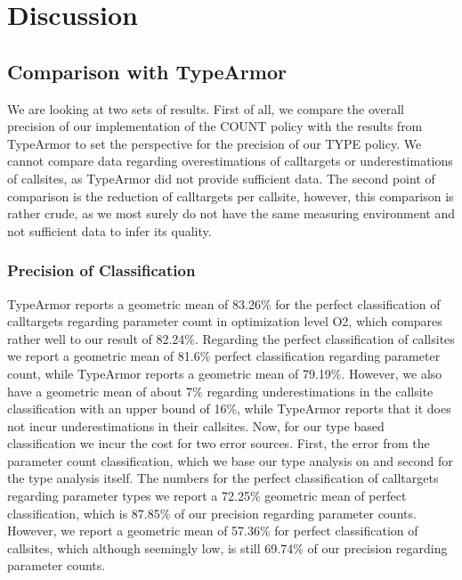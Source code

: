 \section{Discussion}
\label{chapter:Discussion}

\subsection{Comparison with TypeArmor}
\label{section:comptype}
We are looking at two sets of results. First of all, we compare the overall precision of our implementation
of the COUNT policy with the results from TypeArmor to set the perspective for the precision of our TYPE 
policy. We cannot compare data regarding overestimations of calltargets or underestimations of callsites, 
as TypeArmor did not provide sufficient data. The second point of comparison is the reduction of calltargets
per callsite, however, this comparison is rather crude, as we most surely do not have the same measuring
environment and not sufficient data to infer its quality.

\subsubsection{Precision of Classification}
TypeArmor reports a geometric mean of 83.26\% for the perfect classification of calltargets regarding 
parameter count in optimization level O2, which compares rather well to our result of 82.24\%. Regarding
the perfect classification of callsites we report a geometric mean of 81.6\% perfect classification 
regarding parameter count, while TypeArmor reports a geometric mean of 79.19\%. However, we also have
a geometric mean of about 7\% regarding underestimations in the callsite classification with an upper
bound of 16\%, while TypeArmor reports that it does not incur underestimations in their callsites.
Now, for our type based classification we incur the cost for two error sources. First, the error from
the parameter count classification, which we base our type analysis on and second for the type analysis
itself. The numbers for the perfect classification of calltargets regarding parameter types we report a
72.25\% geometric mean of perfect classification, which is 87.85\% of our precision regarding parameter
counts. However, we report a geometric mean of 57.36\%
for perfect classification of callsites, which although seemingly low, is still 69.74\% of our precision
regarding parameter counts.

